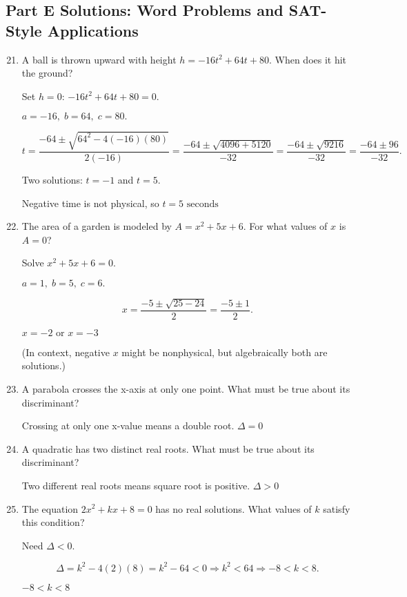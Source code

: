 \documentclass[12pt]{article}
\begin{document}
\subsection*{Part E Solutions: Word Problems and SAT-Style Applications}
\begin{enumerate}
  \setcounter{enumi}{20}
  \item A ball is thrown upward with height \(h = -16t^2 + 64t + 80.\) When does it hit the ground?

  Set \(h = 0\):  
  \(-16t^2 + 64t + 80 = 0.\)

  \(a = -16,\; b = 64,\; c = 80.\)

  \[
  t = \frac{-64 \pm \sqrt{64^2 - 4(-16)(80)}}{2(-16)}
  = \frac{-64 \pm \sqrt{4096 + 5120}}{-32}
  = \frac{-64 \pm \sqrt{9216}}{-32}
  = \frac{-64 \pm 96}{-32}.
  \]

  Two solutions: \(t = -1\) and \(t = 5.\)

  Negative time is not physical, so \(\boxed{t = 5 \text{ seconds}}\)

  \item The area of a garden is modeled by \(A = x^2 + 5x + 6.\) For what values of \(x\) is \(A = 0\)?

  Solve \(x^2 + 5x + 6 = 0.\)

  \(a = 1,\; b = 5,\; c = 6.\)

  \[
  x = \frac{-5 \pm \sqrt{25 - 24}}{2}
  = \frac{-5 \pm 1}{2}.
  \]

  \(\boxed{x = -2 \text{ or } x = -3}\)

  (In context, negative \(x\) might be nonphysical, but algebraically both are solutions.)

  \item A parabola crosses the x-axis at only one point. What must be true about its discriminant?

  Crossing at only one x-value means a double root.  
  \(\boxed{\Delta = 0}\)

  \item A quadratic has two distinct real roots. What must be true about its discriminant?

  Two different real roots means square root is positive.  
  \(\boxed{\Delta > 0}\)

  \item The equation \(2x^2 + kx + 8 = 0\) has no real solutions. What values of \(k\) satisfy this condition?

  Need \(\Delta < 0.\)

  \[
  \Delta = k^2 - 4(2)(8) = k^2 - 64 < 0
  \Rightarrow k^2 < 64
  \Rightarrow -8 < k < 8.
  \]

  \(\boxed{-8 < k < 8}\)
\end{enumerate}
\end{document}
